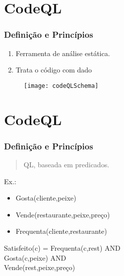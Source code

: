 \documentclass[10pt, aspectratio=169]{beamer}
\begin{document}
\section{CodeQL}
\begin{frame}
  \frametitle{Definição e Princípios} 

  \begin{enumerate}
  \item \vfill Ferramenta de análise estática.
  \item \vfill Trata o código com dado
  \end{enumerate}
\begin{figure} 
	
	\texttt{[image: codeQLSchema]}

\end{figure}
	
 


\end{frame}

\section{CodeQL}
\begin{frame}	
		\frametitle{Definição e Princípios} 
		
		
	\begin{quotation}
		QL, baseada em predicados.
	\end{quotation}
	
Ex.:
\begin{itemize}
	\item Gosta(cliente,peixe)
	\item Vende(restaurante,peixe,preço)
	\item Frequenta(cliente,restaurante)
\end{itemize}


\vfill

Satisfeito(c) = Frequenta(c,rest) AND\\ \hspace{2.3cm}Gosta(c,peixe) AND \\ \hspace{2.3cm}Vende(rest,peixe,preço) 
	
	
	
	
\end{frame}
\end{document}
